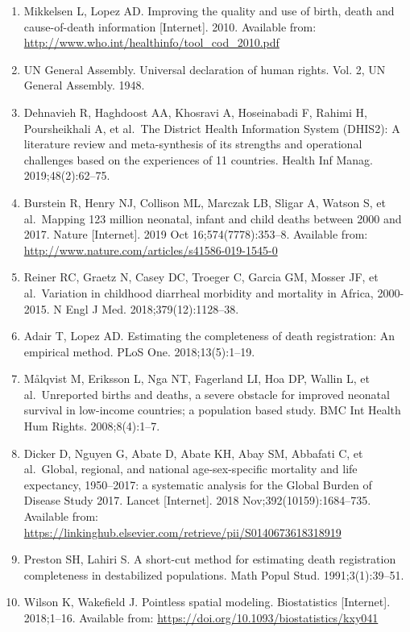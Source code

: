 \documentclass[
]{article}
\begin{document}
\begin{enumerate}
\def\labelenumi{\arabic{enumi}.}
\item
  Mikkelsen L, Lopez AD. Improving the quality and use of birth, death and cause-of-death information {[}Internet{]}. 2010. Available from: \url{http://www.who.int/healthinfo/tool_cod_2010.pdf}
\item
  UN General Assembly. Universal declaration of human rights. Vol. 2, UN General Assembly. 1948.
\item
  Dehnavieh R, Haghdoost AA, Khosravi A, Hoseinabadi F, Rahimi H, Poursheikhali A, et al.~The District Health Information System (DHIS2): A literature review and meta-synthesis of its strengths and operational challenges based on the experiences of 11 countries. Health Inf Manag. 2019;48(2):62--75.
\item
  Burstein R, Henry NJ, Collison ML, Marczak LB, Sligar A, Watson S, et al.~Mapping 123 million neonatal, infant and child deaths between 2000 and 2017. Nature {[}Internet{]}. 2019 Oct 16;574(7778):353--8. Available from: \url{http://www.nature.com/articles/s41586-019-1545-0}
\item
  Reiner RC, Graetz N, Casey DC, Troeger C, Garcia GM, Mosser JF, et al.~Variation in childhood diarrheal morbidity and mortality in Africa, 2000-2015. N Engl J Med. 2018;379(12):1128--38.
\item
  Adair T, Lopez AD. Estimating the completeness of death registration: An empirical method. PLoS One. 2018;13(5):1--19.
\item
  Målqvist M, Eriksson L, Nga NT, Fagerland LI, Hoa DP, Wallin L, et al.~Unreported births and deaths, a severe obstacle for improved neonatal survival in low-income countries; a population based study. BMC Int Health Hum Rights. 2008;8(4):1--7.
\item
  Dicker D, Nguyen G, Abate D, Abate KH, Abay SM, Abbafati C, et al.~Global, regional, and national age-sex-specific mortality and life expectancy, 1950--2017: a systematic analysis for the Global Burden of Disease Study 2017. Lancet {[}Internet{]}. 2018 Nov;392(10159):1684--735. Available from: \url{https://linkinghub.elsevier.com/retrieve/pii/S0140673618318919}
\item
  Preston SH, Lahiri S. A short-cut method for estimating death registration completeness in destabilized populations. Math Popul Stud. 1991;3(1):39--51.
\item
  Wilson K, Wakefield J. Pointless spatial modeling. Biostatistics {[}Internet{]}. 2018;1--16. Available from: \url{https://doi.org/10.1093/biostatistics/kxy041}

\end{enumerate}
\end{document}
